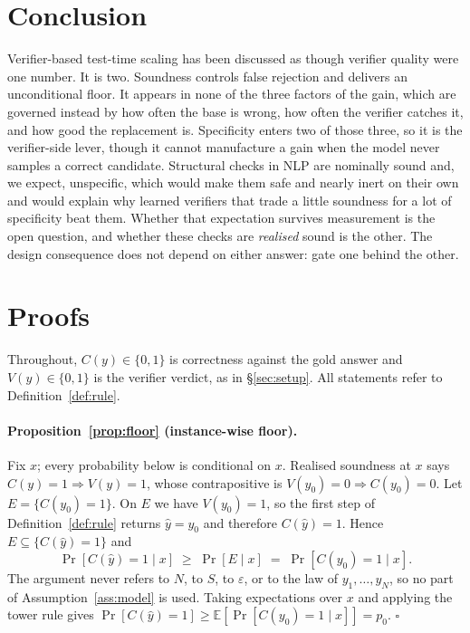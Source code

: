 \documentclass[11pt]{article}
\begin{document}
\section{Conclusion}
Verifier-based test-time scaling has been discussed as though verifier quality were one number. It is two. Soundness controls false rejection and delivers an unconditional floor. It appears in none of the three factors of the gain, which are governed instead by how often the base is wrong, how often the verifier catches it, and how good the replacement is. Specificity enters two of those three, so it is the verifier-side lever, though it cannot manufacture a gain when the model never samples a correct candidate. Structural checks in NLP are nominally sound and, we expect, unspecific, which would make them safe and nearly inert on their own and would explain why learned verifiers that trade a little soundness for a lot of specificity beat them. Whether that expectation survives measurement is the open question, and whether these checks are \emph{realised} sound is the other. The design consequence does not depend on either answer: gate one behind the other.



\appendix
\section{Proofs}\label{app:proofs}
Throughout, $C(y)\in\{0,1\}$ is correctness against the gold answer and $V(y)\in\{0,1\}$ is the verifier verdict, as in \S\ref{sec:setup}. All statements refer to Definition~\ref{def:rule}.

\paragraph{Proposition~\ref{prop:floor} (instance-wise floor).}
Fix $x$; every probability below is conditional on $x$. Realised soundness at $x$ says $C(y)=1\Rightarrow V(y)=1$, whose contrapositive is $V(y_0)=0\Rightarrow C(y_0)=0$. Let $E=\{C(y_0)=1\}$. On $E$ we have $V(y_0)=1$, so the first step of Definition~\ref{def:rule} returns $\hat y=y_0$ and therefore $C(\hat y)=1$. Hence $E\subseteq\{C(\hat y)=1\}$ and
\[\Pr[C(\hat y)=1\mid x]\;\ge\;\Pr[E\mid x]\;=\;\Pr[C(y_0)=1\mid x].\]
The argument never refers to $N$, to $S$, to $\varepsilon$, or to the law of $y_1,\dots,y_N$, so no part of Assumption~\ref{ass:model} is used. Taking expectations over $x$ and applying the tower rule gives $\Pr[C(\hat y)=1]\ge\mathbb{E}[\Pr[C(y_0)=1\mid x]]=p_0$. \hfill$\square$
\end{document}
